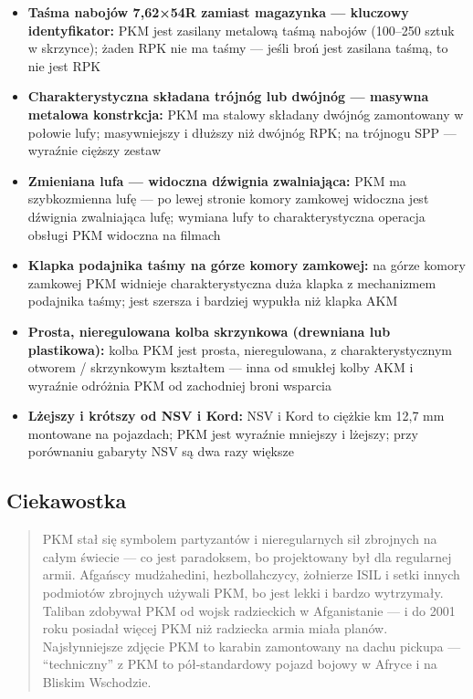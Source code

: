 \documentclass[12pt,oneside]{book}
\providecommand{\tightlist}{%
  \setlength{\itemsep}{0pt}\setlength{\parskip}{0pt}}
\begin{document}
\begin{itemize}
\tightlist
\item
  \textbf{Taśma nabojów 7,62×54R zamiast magazynka --- kluczowy
  identyfikator:} PKM jest zasilany metalową taśmą nabojów (100--250
  sztuk w skrzynce); żaden RPK nie ma taśmy --- jeśli broń jest zasilana
  taśmą, to nie jest RPK
\item
  \textbf{Charakterystyczna składana trójnóg lub dwójnóg --- masywna
  metalowa konstrkcja:} PKM ma stalowy składany dwójnóg zamontowany w
  połowie lufy; masywniejszy i dłuższy niż dwójnóg RPK; na trójnogu SPP
  --- wyraźnie cięższy zestaw
\item
  \textbf{Zmieniana lufa --- widoczna dźwignia zwalniająca:} PKM ma
  szybkozmienna lufę --- po lewej stronie komory zamkowej widoczna jest
  dźwignia zwalniająca lufę; wymiana lufy to charakterystyczna operacja
  obsługi PKM widoczna na filmach
\item
  \textbf{Klapka podajnika taśmy na górze komory zamkowej:} na górze
  komory zamkowej PKM widnieje charakterystyczna duża klapka z
  mechanizmem podajnika taśmy; jest szersza i bardziej wypukła niż
  klapka AKM
\item
  \textbf{Prosta, nieregulowana kolba skrzynkowa (drewniana lub
  plastikowa):} kolba PKM jest prosta, nieregulowana, z
  charakterystycznym otworem / skrzynkowym kształtem --- inna od smukłej
  kolby AKM i wyraźnie odróżnia PKM od zachodniej broni wsparcia
\item
  \textbf{Lżejszy i krótszy od NSV i Kord:} NSV i Kord to ciężkie km
  12,7 mm montowane na pojazdach; PKM jest wyraźnie mniejszy i lżejszy;
  przy porównaniu gabaryty NSV są dwa razy większe
\end{itemize}

\subsection{Ciekawostka}\label{ciekawostka-71}

\begin{quote}
PKM stał się symbolem partyzantów i nieregularnych sił zbrojnych na
całym świecie --- co jest paradoksem, bo projektowany był dla regularnej
armii. Afgańscy mudżahedini, hezbollahczycy, żołnierze ISIL i setki
innych podmiotów zbrojnych używali PKM, bo jest lekki i bardzo
wytrzymały. Taliban zdobywał PKM od wojsk radzieckich w Afganistanie ---
i do 2001 roku posiadał więcej PKM niż radziecka armia miała planów.
Najsłynniejsze zdjęcie PKM to karabin zamontowany na dachu pickupa ---
``techniczny'' z PKM to pół-standardowy pojazd bojowy w Afryce i na
Bliskim Wschodzie.
\end{quote}
\end{document}
